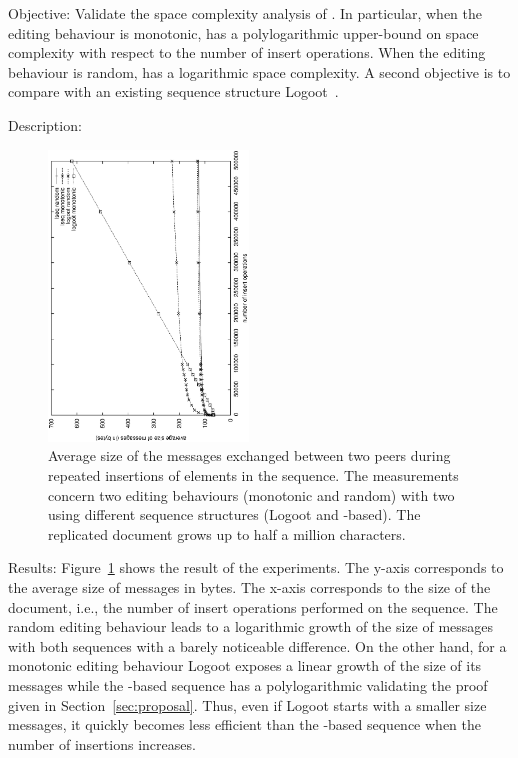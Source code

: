 \begin{asparadesc}
\item [Objective:] Validate the space complexity analysis of \LSEQ. In
  particular, when the editing behaviour is monotonic, \LSEQ has a
  polylogarithmic upper-bound on space complexity with respect to the number of
  insert operations. When the editing behaviour is random, \LSEQ has a
  logarithmic space complexity. A second objective is to compare \LSEQ with
  an existing sequence structure
  Logoot~\cite{weiss2009logoot,weiss2010logootundo}.
\item [Description:]

\begin{figure}
  \centering
  \includegraphics[angle=-90,width=0.475\textwidth]{./img/complexities.eps}
  \caption{\label{fig:complexities} Average size of the messages exchanged
    between two peers during repeated insertions of elements in the
    sequence. The measurements concern two editing behaviours (monotonic and
    random) with two \CRATE using different sequence structures (Logoot
    and \LSEQ-based). The replicated document grows up to half a million
    characters.}
\end{figure}

\item [Results:] Figure~\ref{fig:complexities} shows the result of the
  experiments. The y-axis corresponds to the average size of messages in
  bytes. The x-axis corresponds to the size of the document, i.e., the number
  of insert operations performed on the sequence. The random editing behaviour
  leads to a logarithmic growth of the size of messages with both sequences
  with a barely noticeable difference. On the other hand, for a monotonic
  editing behaviour Logoot exposes a linear growth of the size of its messages
  while the \LSEQ-based sequence has a polylogarithmic validating the proof
  given in Section~\ref{sec:proposal}. Thus, even if Logoot starts with a
  smaller size messages, it quickly becomes less efficient than the
  \LSEQ-based sequence when the number of insertions increases.


\end{asparadesc}
